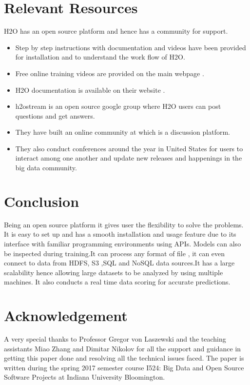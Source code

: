 \documentclass[9pt,twocolumn,twoside]{../../styles/osajnl}
\begin{document}
\section {Relevant Resources}

H2O has an open source platform and hence has a community for support.
\begin{itemize}
\item Step by step instructions with documentation and videos have
   been provided for installation and to understand the work flow of
   H2O\cite{www-h2o-webpage}.
\item Free online training videos are provided on the main webpage
  \cite{www-h2o-learn}.
\item H2O documentation is available on their website
  \cite{www-h2o-webpage}.
\item h2ostream is an open source google group where H2O users can
    post questions and get answers.
\item They have built an online community at\cite{www-h2o-community}
  which is a discussion platform.
\item They also conduct conferences around the year in United States
    for users to interact among one another and update new releases
    and happenings in the big data community\cite{www-h2o-meetups}.
\end{itemize}


\section{Conclusion}

Being an open source platform it gives user the flexibility to solve
the problems. It is easy to set up and has a smooth installation and
usage feature due to its interface with familiar programming
environments using APIs\cite{www-h2o-why}. Models can also be
inspected during training.It can process any format of file , it can
even connect to data from HDFS, S3 ,SQL and NoSQL data
sources\cite{www-h2o-why}.It has a large scalability hence allowing
large datasets to be analyzed by using multiple machines. It also
conducts a real time data scoring for accurate
predictions\cite{www-h2o-why}.

\section{Acknowledgement}

A very special thanks to Professor Gregor von Laszewski and the
teaching assistants Miao Zhang and Dimitar Nikolov for all the support
and guidance in getting this paper done and resolving all the
technical issues faced. The paper is written during the spring 2017
semester course {I524: Big Data and Open Source Software Projects} at
Indiana University Bloomington.
\end{document}
